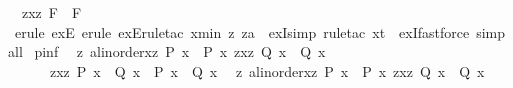 \begin{isabellebody}
\ \ {\isachardoublequoteopen}{\isasymexists}z{\isachardot}{\kern0pt}{\isasymforall}x{\isacharless}{\kern0pt}z{\isachardot}{\kern0pt}\ F\ {\isacharequal}{\kern0pt}\ F{\isachardoublequoteclose}\isanewline
%
\isadelimproof
\ \ %
\endisadelimproof
%
\isatagproof
{}\isamarkupfalse%
\ {\isacharparenleft}{\kern0pt}{\isacharparenleft}{\kern0pt}erule\ exE{\isacharcomma}{\kern0pt}\ erule\ exE{\isacharcomma}{\kern0pt}rule{\isacharunderscore}{\kern0pt}tac\ x{\isacharequal}{\kern0pt}{\isachardoublequoteopen}min\ z\ za{\isachardoublequoteclose}\ \ exI{\isacharcomma}{\kern0pt}simp{\isacharparenright}{\kern0pt}{\isacharplus}{\kern0pt}{\isacharcomma}{\kern0pt}\ {\isacharparenleft}{\kern0pt}rule{\isacharunderscore}{\kern0pt}tac\ x{\isacharequal}{\kern0pt}{\isachardoublequoteopen}t{\isachardoublequoteclose}\ \ exI{\isacharcomma}{\kern0pt}fastforce{\isacharparenright}{\kern0pt}{\isacharplus}{\kern0pt}{\isacharparenright}{\kern0pt}\ simp{\isacharunderscore}{\kern0pt}all%
\endisatagproof
{\isafoldproof}%
%
\isadelimproof
\isanewline
%
\endisadelimproof
\isanewline
{}\isamarkupfalse%
\ pinf{\isacharcolon}{\kern0pt}\isanewline
\ \ {\isachardoublequoteopen}{\isasymlbrakk}{\isasymexists}{\isacharparenleft}{\kern0pt}z\ {\isacharcolon}{\kern0pt}{\isacharcolon}{\kern0pt}{\isacharprime}{\kern0pt}a{\isacharcolon}{\kern0pt}{\isacharcolon}{\kern0pt}linorder{\isacharparenright}{\kern0pt}{\isachardot}{\kern0pt}{\isasymforall}x{\isachargreater}{\kern0pt}z{\isachardot}{\kern0pt}\ P\ x\ {\isacharequal}{\kern0pt}\ P{\isacharprime}{\kern0pt}\ x{\isacharsemicolon}{\kern0pt}\ {\isasymexists}z{\isachardot}{\kern0pt}{\isasymforall}x{\isachargreater}{\kern0pt}z{\isachardot}{\kern0pt}\ Q\ x\ {\isacharequal}{\kern0pt}\ Q{\isacharprime}{\kern0pt}\ x{\isasymrbrakk}\ \isanewline
\ \ \ \ \ {\isasymLongrightarrow}\ {\isasymexists}z{\isachardot}{\kern0pt}{\isasymforall}x{\isachargreater}{\kern0pt}z{\isachardot}{\kern0pt}\ {\isacharparenleft}{\kern0pt}P\ x\ {\isasymand}\ Q\ x{\isacharparenright}{\kern0pt}\ {\isacharequal}{\kern0pt}\ {\isacharparenleft}{\kern0pt}P{\isacharprime}{\kern0pt}\ x\ {\isasymand}\ Q{\isacharprime}{\kern0pt}\ x{\isacharparenright}{\kern0pt}{\isachardoublequoteclose}\isanewline
\ \ {\isachardoublequoteopen}{\isasymlbrakk}{\isasymexists}{\isacharparenleft}{\kern0pt}z\ {\isacharcolon}{\kern0pt}{\isacharcolon}{\kern0pt}{\isacharprime}{\kern0pt}a{\isacharcolon}{\kern0pt}{\isacharcolon}{\kern0pt}linorder{\isacharparenright}{\kern0pt}{\isachardot}{\kern0pt}{\isasymforall}x{\isachargreater}{\kern0pt}z{\isachardot}{\kern0pt}\ P\ x\ {\isacharequal}{\kern0pt}\ P{\isacharprime}{\kern0pt}\ x{\isacharsemicolon}{\kern0pt}\ {\isasymexists}z{\isachardot}{\kern0pt}{\isasymforall}x{\isachargreater}{\kern0pt}z{\isachardot}{\kern0pt}\ Q\ x\ {\isacharequal}{\kern0pt}\ Q{\isacharprime}{\kern0pt}\ x{\isasymrbrakk}\ \isanewline

\end{isabellebody}
